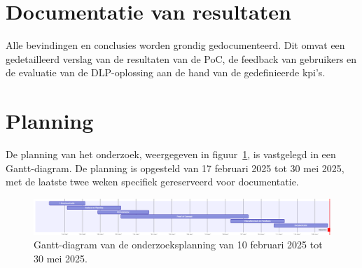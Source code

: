 \section{Documentatie van resultaten}%

Alle bevindingen en conclusies worden grondig gedocumenteerd. 
Dit omvat een gedetailleerd verslag van de resultaten van de PoC, de feedback van gebruikers en de evaluatie van de DLP-oplossing aan de hand van de gedefinieerde \gls{kpi}'s.

\section{Planning}%
\label{sec:planning}

De planning van het onderzoek, weergegeven in figuur~\ref{fig:gantBP}, is vastgelegd in een Gantt-diagram. De planning is opgesteld van 17 februari 2025 tot 30 mei 2025, met de laatste twee weken specifiek gereserveerd voor documentatie.

\begin{figure}[H]
  \centering
  \scriptsize
  \includegraphics[scale=0.50]
  {img/gantt3.png}
  \caption{\label{fig:gantBP}Gantt-diagram van de onderzoeksplanning van 10 februari 2025 tot 30 mei 2025.}
\end{figure}
